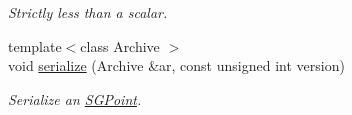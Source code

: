 \begin{DoxyCompactItemize}
\begin{DoxyCompactList}\small\item\em Strictly less than a scalar. \end{DoxyCompactList}\item 
\mbox{\label{classSGPoint_a1fbc1552f839d84bbcac667c768e9726}} 
{\footnotesize template$<$class Archive $>$ }\\void \hyperlink{classSGPoint_a1fbc1552f839d84bbcac667c768e9726}{serialize} (Archive \&ar, const unsigned int version)
\begin{DoxyCompactList}\small\item\em Serialize an \hyperlink{classSGPoint}{S\+G\+Point}. \end{DoxyCompactList}\end{DoxyCompactItemize}
